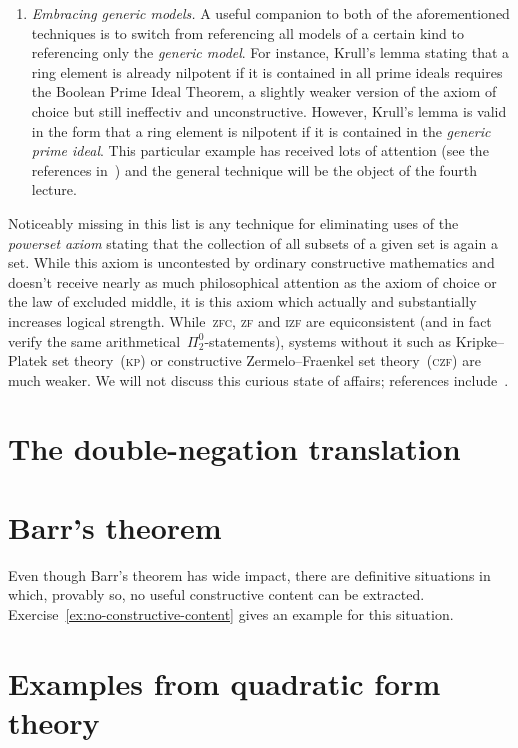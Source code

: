 \documentclass[10pt,reqno,a4paper,openany]{amsbook}
\theoremstyle{definition}
\theoremstyle{plain}
\theoremstyle{remark}
\newcommand{\?}{\,{:}\,}
\renewcommand{\_}{\mathpunct{.}\,}
\begin{document}
\begin{enumerate}
\item \emph{Embracing generic models.} A useful companion to both of the
aforementioned techniques is to switch from referencing all models of a certain
kind to referencing only the \emph{generic model}. For instance, Krull's lemma
stating that a ring element is already nilpotent if it is contained in all
prime ideals requires the Boolean Prime Ideal Theorem, a slightly weaker
version of the axiom of choice but still ineffectiv and unconstructive.
However, Krull's lemma is valid in the form that a ring element is nilpotent if
it is contained in the \emph{generic prime ideal}. This particular example has
received lots of attention (see the references
in~\cite{blechschmidt-schuster:constructive-maximal-ideals}) and the general
technique will be the object of the fourth lecture.
\end{enumerate}

Noticeably missing in this list is any technique for eliminating uses of the
\emph{powerset axiom} stating that the collection of all subsets of a given
set is again a set. While this axiom is uncontested by ordinary constructive
mathematics and doesn't receive nearly as much philosophical attention as the
axiom of choice or the law of excluded middle, it is this axiom which actually
and substantially increases logical strength. While~\textsc{zfc}, \textsc{zf}
and \textsc{izf} are equiconsistent (and in fact verify the same
arithmetical~$\Pi^0_2$-statements), systems without it such as Kripke--Platek
set theory~(\textsc{kp}) or constructive Zermelo--Fraenkel set
theory~(\textsc{czf}) are much weaker. We will not discuss this curious state
of affairs; references include~\cite{crosilla:predicativity,aczel-rathjen:cst}.


\section{The double-negation translation}

\section{Barr's theorem}

Even though Barr's theorem has wide impact, there are definitive situations in
which, provably so, no useful constructive content can be extracted.
Exercise~\ref{ex:no-constructive-content} gives an example for this situation.


\section{Examples from quadratic form theory}
\end{document}
